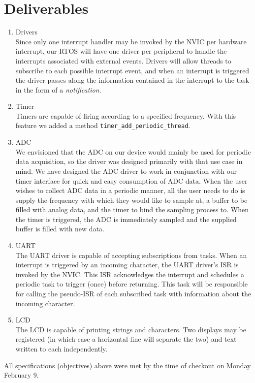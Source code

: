 \documentclass[12pt]{article}
\begin{document}
\section{Deliverables}
\begin{enumerate}
\item Drivers \\
  Since only one interrupt handler may be invoked by the NVIC per
  hardware interrupt, our RTOS will have one driver per peripheral to
  handle the interrupts associated with external events. Drivers will
  allow threads to subscribe to each possible interrupt event, and
  when an interrupt is triggered the driver passes along the
  information contained in the interrupt to the task in the form of a
  \emph{notification}.
\item Timer \\
  Timers are capable of firing according to a specified
  frequency. With this feature we added a method
  \verb|timer_add_periodic_thread|.
\item ADC \\
  We envisioned that the ADC on our device would mainly be used for
  periodic data acquisition, so the driver was designed primarily with
  that use case in mind. We have designed the ADC driver to work in
  conjunction with our timer interface for quick and easy consumption
  of ADC data. When the user wishes to collect ADC data in a periodic
  manner, all the user needs to do is supply the frequency with which
  they would like to sample at, a buffer to be filled with analog
  data, and the timer to bind the sampling process to. When the timer
  is triggered, the ADC is immediately sampled and the supplied buffer
  is filled with new data.
\item UART \\
  The UART driver is capable of accepting subscriptions from
  tasks. When an interrupt is triggered by an incoming character, the
  UART driver's ISR is invoked by the NVIC. This ISR acknowledges the
  interrupt and schedules a periodic task to trigger (once) before
  returning. This task will be responsible for calling the pseudo-ISR
  of each subscribed task with information about the incoming
  character.
\item LCD \\
  The LCD is capable of printing strings and characters. Two displays
  may be registered (in which case a horizontal line will separate the
  two) and text written to each independently.
\end{enumerate}
All specifications (objectives) above were met by the time of checkout
on Monday February 9.
\end{document}
